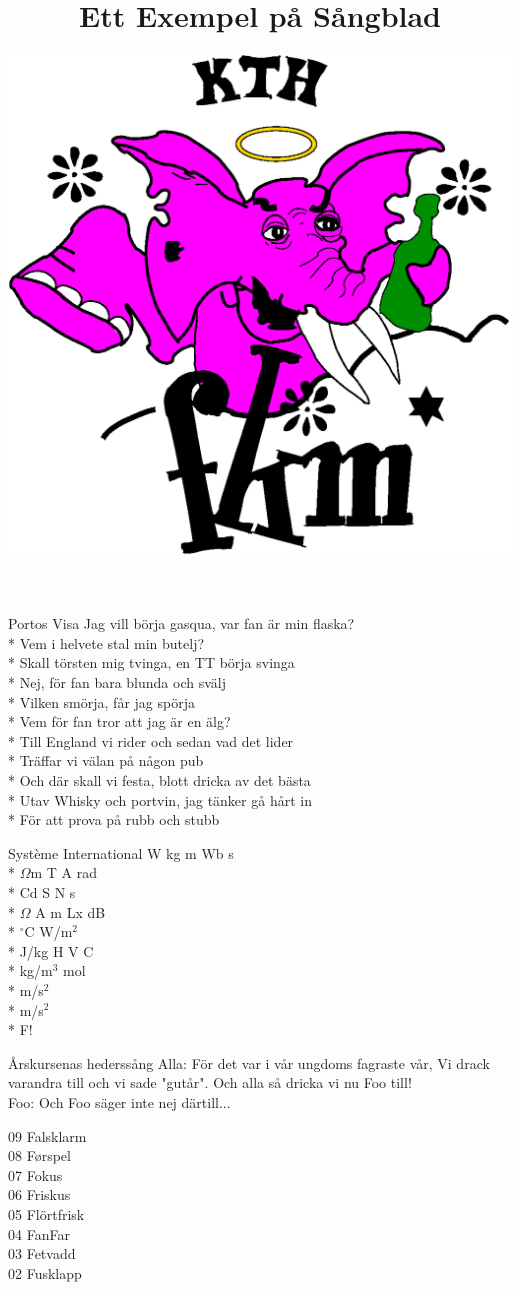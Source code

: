 \documentclass[a4paper, twoside, titlepage]{blad}
\title{Ett Exempel på Sångblad}
\author{\includegraphics[width=.8 \textwidth ]{fkmlogga.eps}	}
\date{}                          %
\begin{document}
\maketitle
\begin{sang}{Portos Visa}
Jag vill börja gasqua, var fan är min flaska?\\*
Vem i helvete stal min butelj?\\*
Skall törsten mig tvinga, en TT börja svinga\\*
Nej, för fan bara blunda och svälj\\*
Vilken smörja, får jag spörja\\*
Vem för fan tror att jag är en älg?\\*
Till England vi rider och sedan vad det lider\\*
Träffar vi välan på någon pub\\*
Och där skall vi festa, blott dricka av det bästa\\*
Utav Whisky och portvin, jag tänker gå hårt in\\*
För att prova på rubb och stubb
\end{sang}


\begin{sang}{Système International}
W kg m Wb s\\*
$\Omega$m T A rad\\*
Cd S N s\\*
$\Omega$ A m Lx dB\\*
$^\circ$C W/m$^2$\\*
J/kg H V C\\*
kg/m$^3$ mol\\*
m/s$^2$\\*
m/s$^2$\\*
F!
\end{sang}


\begin{sang}{Årskursenas hederssång}
Alla:   För det var i vår ungdoms fagraste vår,
Vi drack varandra till och vi sade "gutår".
Och alla så dricka vi nu Foo till! \\

Foo:    Och Foo säger inte nej därtill...

09 Falsklarm \\
08 F\o rspel \\
07 Fokus \\
06 Friskus \\
05 Flörtfrisk \\
04 FanFar \\
03 Fetvadd \\
02 Fusklapp \\
\end{sang}
\end{document}
